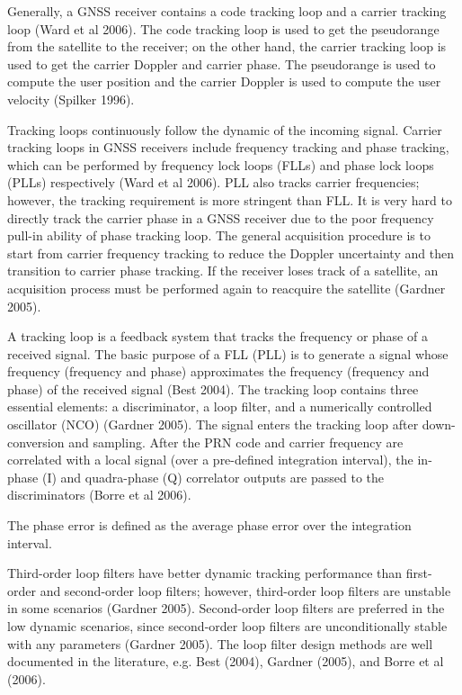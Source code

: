 Generally, a GNSS receiver contains a code tracking loop and a carrier tracking loop (Ward et al 2006). The code tracking loop is used to get the pseudorange from the satellite to the receiver; on the other hand, the carrier tracking loop is used to get the carrier Doppler and carrier phase. The pseudorange is used to compute the user position and the carrier Doppler is used to compute the user velocity (Spilker 1996).



Tracking loops continuously follow the dynamic of the incoming signal. Carrier tracking loops in GNSS receivers include frequency tracking and phase tracking, which can be performed by frequency lock loops (FLLs) and phase lock loops (PLLs) respectively (Ward et al 2006). PLL also tracks carrier frequencies; however, the tracking requirement is more stringent than FLL. It is very hard to directly track the carrier phase in a GNSS receiver due to the poor frequency pull-in ability of phase tracking loop. The general acquisition procedure is to start from carrier frequency tracking to reduce the Doppler uncertainty and then transition to carrier phase tracking. If the receiver loses track of a satellite, an acquisition process must be performed again to reacquire the satellite (Gardner 2005).


A tracking loop is a feedback system that tracks the frequency or phase of a received signal. The basic purpose of a FLL (PLL) is to generate a signal whose frequency (frequency and phase) approximates the frequency (frequency and phase) of the received signal (Best 2004). The tracking loop contains three essential elements: a discriminator, a loop filter, and a numerically controlled oscillator (NCO) (Gardner 2005). The signal enters the tracking loop after down-conversion and sampling. After the PRN code and carrier frequency are correlated with a local signal (over a pre-defined integration interval), the in-phase (I) and quadra-phase (Q) correlator outputs are passed to the discriminators (Borre et al 2006). 

The phase error is defined as the average phase error over the integration interval. 

Third-order loop filters have better dynamic tracking performance than first-order and second-order loop filters; however, third-order loop filters are unstable in some scenarios (Gardner 2005). Second-order loop filters are preferred in the low dynamic scenarios, since second-order loop filters are unconditionally stable with any parameters (Gardner 2005). The loop filter design methods are well documented in the literature, e.g. Best
(2004), Gardner (2005), and Borre et al (2006).


